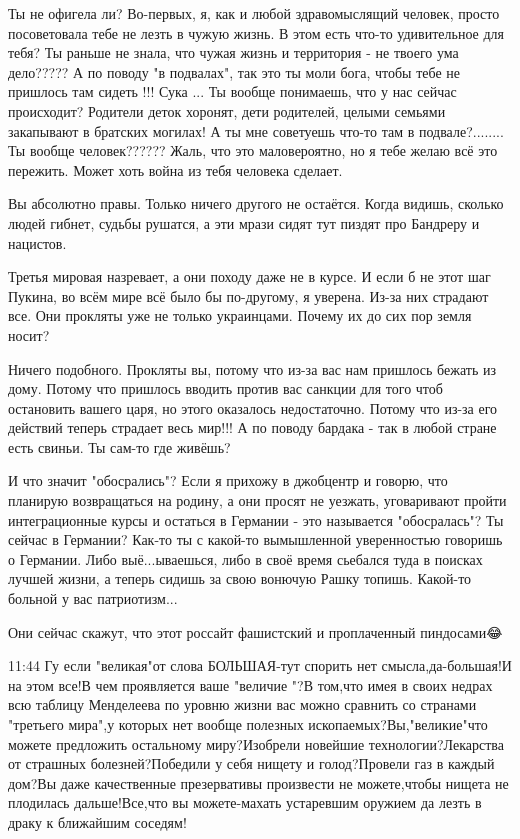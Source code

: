 Ты не офигела ли? Во-первых, я, как и любой здравомыслящий человек, просто
посоветовала тебе не лезть в чужую жизнь. В этом есть что-то удивительное для
тебя? Ты раньше не знала, что чужая жизнь и территория - не твоего ума
дело????? А по поводу "в подвалах", так это ты моли бога, чтобы тебе не
пришлось там сидеть !!! Сука ... Ты вообще понимаешь, что у нас сейчас
происходит? Родители деток хоронят, дети родителей, целыми семьями закапывают в
братских могилах! А ты мне советуешь что-то там в подвале?........ Ты вообще
человек?????? Жаль, что это маловероятно, но я тебе желаю всё это пережить.
Может хоть война из тебя человека сделает.

Вы абсолютно правы. Только ничего другого не остаётся. Когда видишь, сколько
людей гибнет, судьбы рушатся, а эти мрази сидят тут пиздят про Бандреру и
нацистов.

Третья мировая назревает, а они походу даже не в курсе. И если б не этот шаг
Пукина, во всём мире всё было бы по-другому, я уверена. Из-за них страдают все.
Они прокляты уже не только украинцами. Почему их до сих пор земля носит?

Ничего подобного. Прокляты вы, потому что из-за вас нам пришлось бежать из
дому. Потому что пришлось вводить против вас санкции для того чтоб остановить
вашего царя, но этого оказалось недостаточно. Потому что из-за его действий
теперь страдает весь мир!!! А по поводу бардака - так в любой стране есть
свиньи. Ты сам-то где живёшь?

И что значит "обосрались"? Если я прихожу в джобцентр и говорю, что планирую
возвращаться на родину, а они просят не уезжать, уговаривают пройти
интеграционные курсы и остаться в Германии - это называется "обосралась"? Ты
сейчас в Германии? Как-то ты с какой-то вымышленной уверенностью говоришь о
Германии. Либо выё...ываешься, либо в своё время сьебался туда в поисках лучшей
жизни, а теперь сидишь за свою вонючую Рашку топишь. Какой-то больной у вас
патриотизм...

Они сейчас скажут, что этот россайт фашистский и проплаченный пиндосами😂

11:44
Гу если "великая"от слова БОЛЬШАЯ-тут спорить нет смысла,да-большая!И на этом
все!В чем проявляется ваше "величие "?В том,что имея в своих недрах всю таблицу
Менделеева по уровню жизни вас можно сравнить со странами "третьего мира",у
которых нет вообще полезных ископаемых?Вы,"великие"что можете предложить
остальному миру?Изобрели новейшие технологии?Лекарства от страшных
болезней?Победили у себя нищету и голод?Провели газ в каждый дом?Вы даже
качественные презервативы произвести не можете,чтобы нищета не плодилась
дальше!Все,что вы можете-махать устаревшим оружием да лезть в драку к ближайшим
соседям!

